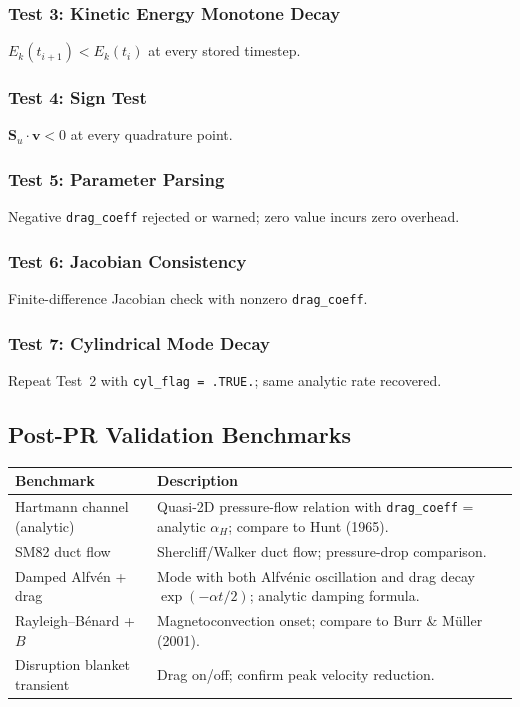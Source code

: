 \documentclass[11pt,letterpaper]{article}
\begin{document}
\subsubsection{Test 3: Kinetic Energy Monotone Decay}
$E_k(t_{i+1}) < E_k(t_i)$ at every stored timestep.

\subsubsection{Test 4: Sign Test}
$\mathbf{S}_u \cdot \mathbf{v} < 0$ at every quadrature point.

\subsubsection{Test 5: Parameter Parsing}
Negative \texttt{drag\_coeff} rejected or warned; zero value incurs zero overhead.

\subsubsection{Test 6: Jacobian Consistency}
Finite-difference Jacobian check with nonzero \texttt{drag\_coeff}.

\subsubsection{Test 7: Cylindrical Mode Decay}
Repeat Test~2 with \texttt{cyl\_flag = .TRUE.}; same analytic rate recovered.

\subsection{Post-PR Validation Benchmarks}

\begin{center}
\begin{longtable}{p{}p{}}
\toprule
\textbf{Benchmark} & \textbf{Description} \\
\midrule
Hartmann channel (analytic) & Quasi-2D pressure-flow relation with
  \texttt{drag\_coeff} = analytic $\alpha_H$; compare to Hunt (1965). \\
SM82 duct flow & Shercliff/Walker duct flow; pressure-drop comparison. \\
Damped Alfv\'{e}n + drag & Mode with both Alfv\'{e}nic oscillation and drag decay
  $\exp(-\alpha t/2)$; analytic damping formula. \\
Rayleigh--B\'{e}nard + $B$ & Magnetoconvection onset; compare to Burr \& Müller (2001). \\
Disruption blanket transient & Drag on/off; confirm peak velocity reduction. \\
\bottomrule
\end{longtable}
\end{center}
\end{document}
